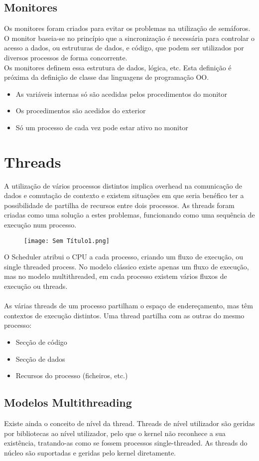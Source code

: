 \documentclass[10pt,a4paper]{report}
\begin{document}
\subsection{Monitores}
Os monitores foram criados para evitar os problemas na utilização de semáforos. O monitor baseia-se no princípio que a sincronização é necessária para controlar o acesso a dados, ou estruturas de dados, e código, que podem ser utilizados por diversos processos de forma concorrente.\\
Os monitores definem essa estrutura de dados, lógica, etc. Esta definição é próxima da definição de classe das linguagens de programação OO.
\begin{itemize}
\item As variáveis internas só são acedidas pelos
procedimentos do monitor
\item Os procedimentos são acedidos do exterior
\item Só um processo de cada vez pode estar ativo no monitor
\end{itemize}
\section{Threads}
A utilização de vários processos distintos implica overhead na comunicação de dados e comutação de contexto e existem situações em que seria benéfico ter a possibilidade de partilha de recursos entre dois processos. As threads foram criadas como uma solução a estes problemas, funcionando como uma sequência de execução num processo.
\begin{figure}[H]
\centering
\texttt{[image: Sem Título1.png]}
\end{figure}
O Scheduler atribui o CPU a cada processo, criando um fluxo de execução, ou single threaded process. No modelo clássico existe apenas um fluxo de execução, mas no modelo  multithreaded, em cada processo existem vários fluxos de execução ou threads.\\
\\
As várias threads de um processo partilham o espaço de endereçamento, mas têm contextos de execução distintos. Uma thread partilha com as outras do mesmo processo:
\begin{itemize}
\item Secção de código
\item Secção de dados
\item Recursos do processo (ficheiros, etc.)
\end{itemize}
\subsection{Modelos Multithreading}
Existe ainda o conceito de nível da thread. Threads de nível utilizador são geridas por bibliotecas ao nível utilizador, pelo que o kernel não reconhece a sua existência, tratando-as como se fossem processos single-threaded. As threads do núcleo são suportadas e geridas pelo kernel diretamente.
\end{document}
